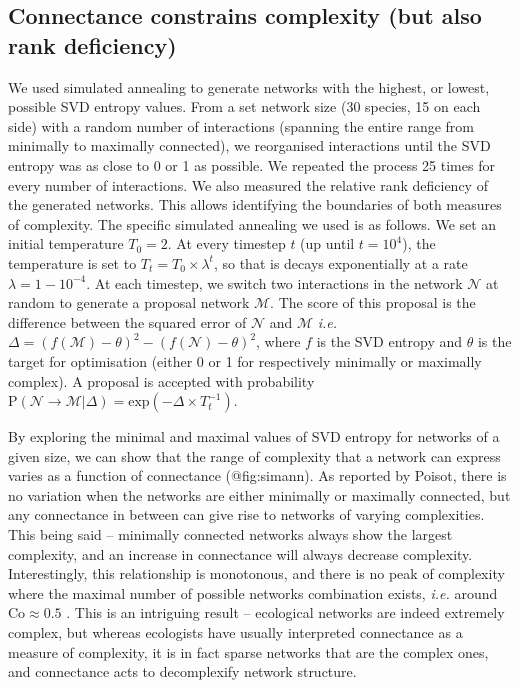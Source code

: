 \subsection{Connectance constrains complexity (but also rank
deficiency)}\label{connectance-constrains-complexity-but-also-rank-deficiency}

We used simulated annealing \cite{Kirkpatrick1984OptSim} to generate networks
with the highest, or lowest, possible SVD entropy values. From a set network
size (30 species, 15 on each side) with a random number of interactions
(spanning the entire range from minimally to maximally connected), we
reorganised interactions until the SVD entropy was as close to 0 or 1 as
possible. We repeated the process 25 times for every number of interactions. We
also measured the relative rank deficiency of the generated networks. This
allows identifying the boundaries of both measures of complexity. The specific
simulated annealing we used is as follows. We set an initial temperature \(T_0 =
2\). At every timestep \(t\) (up until \(t = 10^4\)), the temperature is set to
\(T_t = T_0\times\lambda^t\), so that is decays exponentially at a rate
\(\lambda = 1 - 10^{-4}\). At each timestep, we switch two interactions in the
network \(\mathcal{N}\) at random to generate a proposal network
\(\mathcal{M}\). The score of this proposal is the difference between the
squared error of \(\mathcal{N}\) and \(\mathcal{M}\) \emph{i.e.} \(\Delta =
(f(\mathcal{M})-\theta)^2-(f(\mathcal{N})-\theta)^2\), where \(f\) is the SVD
entropy and \(\theta\) is the target for optimisation (either 0 or 1 for
respectively minimally or maximally complex). A proposal is accepted with
probability \(\text{P}(\mathcal{N} \rightarrow \mathcal{M} | \Delta) =
\text{exp}\left(-\Delta\times T_t^{-1}\right)\).

By exploring the minimal and maximal values of SVD entropy for networks of a
given size, we can show that the range of complexity that a network can express
varies as a function of connectance (@fig:simann). As reported by
Poisot\cite{Poisot2014WheEco}, there is no variation when the networks are
either minimally or maximally connected, but any connectance in between can give
rise to networks of varying complexities. This being said -- minimally connected
networks always show the largest complexity, and an increase in connectance will
always decrease complexity. Interestingly, this relationship is monotonous, and
there is no peak of complexity where the maximal number of possible networks
combination exists, \emph{i.e.} around \(\text{Co} \approx 0.5\)
\cite{Poisot2014WheEco}. This is an intriguing result -- ecological networks are
indeed extremely complex, but whereas ecologists have usually interpreted
connectance as a measure of complexity, it is in fact sparse networks that are
the complex ones, and connectance acts to decomplexify network structure.

